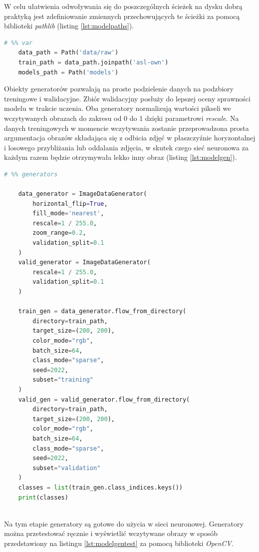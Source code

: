 \documentclass[a4paper,12pt,oneside]{book} %
\begin{document}
W celu ułatwienia odwoływania się do poszczególnych ścieżek na dysku dobrą praktyką jest zdefiniowanie zmiennych przechowujących te ścieżki za pomocą biblioteki \emph{pathlib} (listing \ref{lst:modelpaths}).

\begin{lstlisting}[language=Python, caption={Definicja ścieżek do danych i modeli}, label={lst:modelpaths}]
	# %% var
	data_path = Path('data/raw')
	train_path = data_path.joinpath('asl-own')
	models_path = Path('models')
\end{lstlisting}

Obiekty generatorów pozwalają na proste podzielenie danych na podzbiory treningowe i walidacyjne. Zbiór walidacyjny posłuży do lepszej oceny sprawności modelu w trakcie uczenia. Oba generatory normalizują wartości pikseli we wczytywanych obrazach do zakresu od 0 do 1 dzięki parametrowi \emph{rescale}. Na danych treningowych w momencie wczytywania zostanie przeprowadzona prosta argumentacja obrazów składająca się z odbicia zdjęć w płaszczyźnie horyzontalnej i losowego przybliżania lub oddalania zdjęcia, w skutek czego sieć neuronowa za każdym razem będzie otrzymywała lekko inny obraz (listing \ref{lst:modelgen}).

\begin{lstlisting}[language=Python, caption={Definicja generatorów}, label={lst:modelgen}]
	# %% generators
	
	data_generator = ImageDataGenerator(
		horizontal_flip=True,
		fill_mode='nearest',
		rescale=1 / 255.0,
		zoom_range=0.2,
		validation_split=0.1
	)
	valid_generator = ImageDataGenerator(
		rescale=1 / 255.0,
		validation_split=0.1
	)
	
	train_gen = data_generator.flow_from_directory(
		directory=train_path,
		target_size=(200, 200),
		color_mode="rgb",
		batch_size=64,
		class_mode="sparse",
		seed=2022,
		subset="training"
	)
	valid_gen = valid_generator.flow_from_directory(
		directory=train_path,
		target_size=(200, 200),
		color_mode="rgb",
		batch_size=64,
		class_mode="sparse",
		seed=2022,
		subset="validation"
	)
	classes = list(train_gen.class_indices.keys())
	print(classes)
	
\end{lstlisting}

Na tym etapie generatory są gotowe do użycia w sieci neuronowej. Generatory można przetestować ręcznie i wyświetlić wczytywane obrazy w sposób przedstawiony na listingu \ref{lst:modelgentest} za pomocą biblioteki \emph{OpenCV}.
\end{document}
